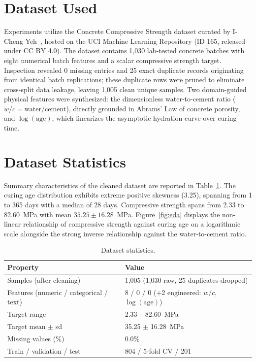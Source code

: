 \documentclass[conference,10pt,a4paper]{IEEEtran}
\begin{document}
\section{Dataset Used}
Experiments utilize the Concrete Compressive Strength dataset curated by I-Cheng Yeh~\cite{ds}, hosted on the UCI Machine Learning Repository (ID 165, released under CC BY 4.0). The dataset contains 1,030 lab-tested concrete batches with eight numerical batch features and a scalar compressive strength target. Inspection revealed 0 missing entries and 25 exact duplicate records originating from identical batch replications; these duplicate rows were pruned to eliminate cross-split data leakage, leaving 1,005 clean unique samples. Two domain-guided physical features were synthesized: the dimensionless water-to-cement ratio ($w/c = \text{water}/\text{cement}$), directly grounded in Abrams' Law of concrete porosity, and $\log(\text{age})$, which linearizes the asymptotic hydration curve over curing time.

\section{Dataset Statistics}
Summary characteristics of the cleaned dataset are reported in Table~\ref{tab:stats}. The curing age distribution exhibits extreme positive skewness (3.25), spanning from 1 to 365 days with a median of 28 days. Compressive strength spans from 2.33 to 82.60~MPa with mean $35.25 \pm 16.28$~MPa. Figure~\ref{fig:eda} displays the non-linear relationship of compressive strength against curing age on a logarithmic scale alongside the strong inverse relationship against the water-to-cement ratio.

\begin{table}[h]
\centering
\caption{Dataset statistics.}
\label{tab:stats}
\begin{tabular}{ll}
\toprule
Property & Value \\
\midrule
Samples (after cleaning) & 1,005 (1,030 raw, 25 duplicates dropped) \\
Features (numeric / categorical / text) & 8 / 0 / 0 (+2 engineered: $w/c$, $\log(\text{age})$) \\
Target range & 2.33 -- 82.60~MPa \\
Target mean $\pm$ sd & 35.25 $\pm$ 16.28~MPa \\
Missing values (\%) & 0.0\% \\
Train / validation / test & 804 / 5-fold CV / 201 \\
\bottomrule
\end{tabular}
\end{table}
\end{document}
